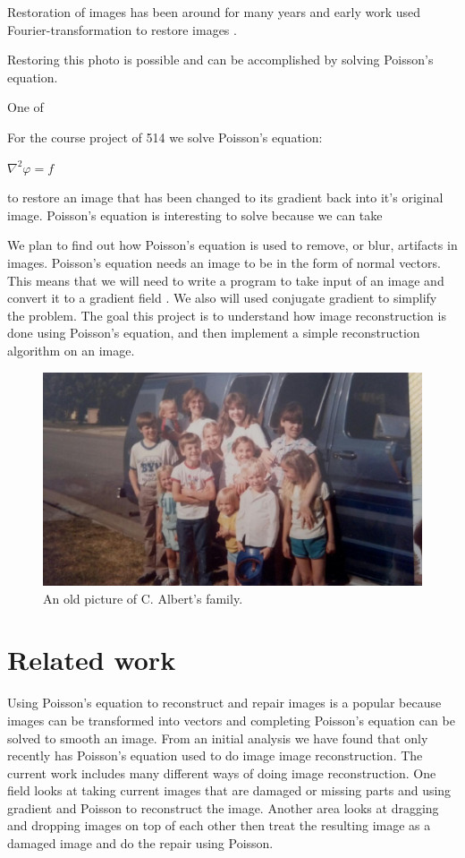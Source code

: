 \documentclass[10pt,twopage]{acmsiggraph}
\begin{document}
Restoration of images has been around for many years and early work used Fourier-transformation to restore images \cite{richardson72}. 

Restoring this photo is possible and can be accomplished by solving Poisson's equation.

One of 

For the course project of 514 we solve Poisson's equation:

\ensuremath{\nabla^2 \varphi = f}

to restore an image that has been changed to its gradient back into it's original image. Poisson's equation is interesting to solve because we can take 

We plan to find out how Poisson's equation is used to remove, or blur, artifacts in images. Poisson's equation needs an image to be in the form of normal vectors. This means that we will need to write a program to take input of an image and convert it to a gradient field \cite{Perez}. We also will used conjugate gradient to simplify the problem. The goal this project is to understand how image reconstruction is done using Poisson's equation, and then implement a simple reconstruction algorithm on an image.

\begin{figure}
\centering
\includegraphics[width=.44\textwidth]{fig/family.jpg}
\caption{An old picture of C. Albert's family.}
\label{family}
\end{figure}

\section{Related work}

Using Poisson's equation to reconstruct and repair images is a popular because images can be transformed into vectors and completing Poisson's equation can be solved to smooth an image. From an initial analysis we have found that only recently \cite{Bertalmio} has Poisson's equation used to do image image reconstruction. The current work includes many different ways of doing image reconstruction. One field looks at taking current images that are damaged or missing parts and using gradient and Poisson to reconstruct the image. Another area looks at dragging and dropping images on top of each other then treat the resulting image as a damaged image and do the repair using Poisson.
\end{document}
